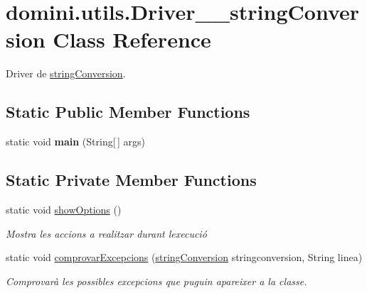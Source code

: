 \hypertarget{classdomini_1_1utils_1_1Driver____stringConversion}{}\section{domini.\+utils.\+Driver\+\_\+\+\_\+string\+Conversion Class Reference}
\label{classdomini_1_1utils_1_1Driver____stringConversion}


Driver de \hyperlink{classdomini_1_1utils_1_1stringConversion}{string\+Conversion}.  


\subsection*{Static Public Member Functions}
\begin{DoxyCompactItemize}
\item 
\mbox{\label{classdomini_1_1utils_1_1Driver____stringConversion_a9198e7ef0d20a8ed911b5ecd83e1e01e}} 
static void {\bfseries main} (String\mbox{[}$\,$\mbox{]} args)
\end{DoxyCompactItemize}
\subsection*{Static Private Member Functions}
\begin{DoxyCompactItemize}
\item 
\mbox{\label{classdomini_1_1utils_1_1Driver____stringConversion_aedcb959866770a9e6bc039d20602b1e9}} 
static void \hyperlink{classdomini_1_1utils_1_1Driver____stringConversion_aedcb959866770a9e6bc039d20602b1e9}{show\+Options} ()
\begin{DoxyCompactList}\small\item\em Mostra les accions a realitzar durant l\textquotesingle{}execució \end{DoxyCompactList}\item 
static void \hyperlink{classdomini_1_1utils_1_1Driver____stringConversion_a024c991699ce1aac984d31cd210396e3}{comprovar\+Excepcions} (\hyperlink{classdomini_1_1utils_1_1stringConversion}{string\+Conversion} stringconversion, String linea)
\begin{DoxyCompactList}\small\item\em Comprovarà les possibles excepcions que puguin apareixer a la classe. \end{DoxyCompactList}\end{DoxyCompactItemize}


